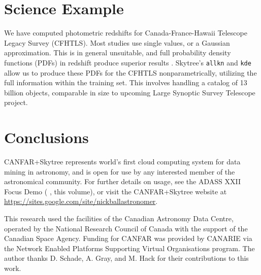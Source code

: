 \section{Science Example} \label{Sec: Science Example}

We have computed photometric redshifts for Canada-France-Hawaii Telescope Legacy Survey (CFHTLS). Most studies use single values, or a Gaussian approximation. This is in general unsuitable, and full probability density functions (PDFs) in redshift produce superior results \citep{ball:pdfphotoz}. Skytree's {\tt allkn} and {\tt kde} allow us to produce these PDFs for the CFHTLS nonparametrically, utilizing the full information within the training set. This involves handling a catalog of 13 billion objects, comparable in size to upcoming Large Synoptic Survey Telescope project.

\section{Conclusions}

CANFAR+Skytree represents world's first cloud computing system for data mining in astronomy, and is open for use by any interested member of the astronomical community. For further details on usage, see the ADASS XXII Focus Demo (\citeauthor{ball:adass12focusdemo} \citeyear{ball:adass12focusdemo}, this volume), or visit the CANFAR+Skytree website at \url{https://sites.google.com/site/nickballastronomer}.

\acknowledgements This research used the facilities of the Canadian Astronomy Data Centre, operated by the National Research Council of Canada with the support of the Canadian Space Agency. Funding for CANFAR was provided by CANARIE via the Network Enabled Platforms Supporting Virtual Organisations program. The author thanks D. Schade, A. Gray, and M. Hack for their contributions to this work.


